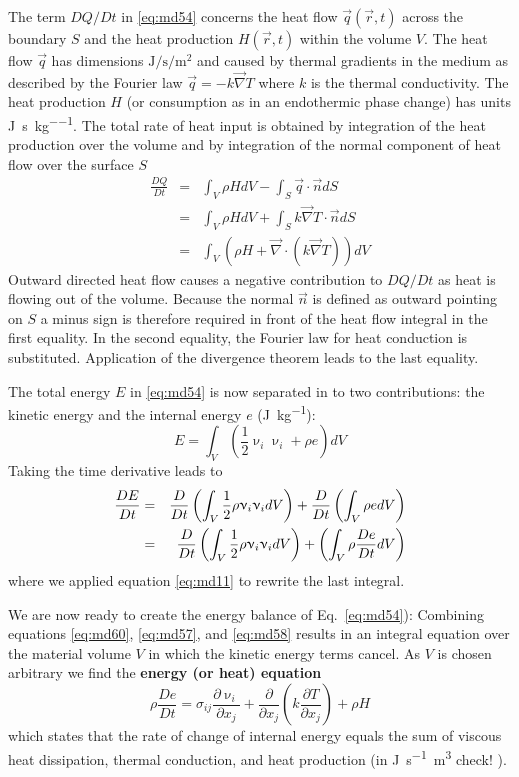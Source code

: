 The term $DQ/Dt$ in \eqref{eq:md54} concerns the heat flow $\vec{q}(\vec{r},t)$
across the boundary $S$ and the heat production $H(\vec{r},t)$
within the volume $V$. The heat flow $\vec{q}$ has dimensions 
$\si{\joule\per\second\per\square\meter}$
and caused by thermal gradients in the medium as described by the Fourier law
$\vec{q}=-k \vec\nabla T$ where $k$ is the thermal conductivity. 
The heat production $H$ (or consumption as in an endothermic phase change) has units 
\si{\joule\per\second\per\kg}.
The total rate of heat input is
obtained by integration of the heat production over the volume and by integration of the
normal component of heat flow over the surface $S$
\begin{eqnarray}
\frac{DQ}{Dt} 
&=& \int_V \rho H dV - \int_S \vec{q} \cdot \vec{n} dS \\
&=& \int_V \rho H dV + \int_S k \vec\nabla T  \cdot \vec{n} dS \\
&=& \int_V \left(  \rho H + \vec\nabla \cdot (  k \vec\nabla T )  \right) dV 
\label{eq:md58}
\end{eqnarray}
Outward directed heat flow causes a negative contribution to $DQ/Dt$ 
as heat is flowing out of
the volume. Because the normal $\vec{n}$ is defined as outward pointing on $S$ a minus sign is
therefore required in front of the heat flow integral in the first equality. In the second
equality, the Fourier law for heat conduction is substituted. Application of the divergence
theorem leads to the last equality.

The total energy $E$ in \eqref{eq:md54} is now separated in to two contributions: the kinetic energy and
the internal energy $e$ (\si{\joule\per\kg}):
\begin{equation}
E = \int_V (\frac{1}{2} \upnu_i \upnu_i + \rho e)dV
\label{eq:md59}
\end{equation}
Taking the time derivative leads to
\begin{eqnarray}
\frac{DE}{Dt} &=& \frac{D}{Dt} \left( \int_V \frac12 \rho \upnu_i \upnu_i dV   \right)
+ \frac{D}{Dt} \left( \int_V \rho e dV  \right) \nonumber\\
&=& \frac{D}{Dt} \left( \int_V \frac12 \rho \upnu_i \upnu_i dV   \right)
+ \left( \int_V \rho \frac{De}{Dt} dV  \right) 
\label{eq:md60}
\end{eqnarray}
where we applied equation \eqref{eq:md11} to rewrite the last integral.

We are now ready to create the energy balance of Eq.~\eqref{eq:md54}):
Combining equations \eqref{eq:md60}, \eqref{eq:md57}, and
\eqref{eq:md58} results in an integral equation over the material volume $V$ in which the kinetic
energy terms cancel. As $V$ is chosen arbitrary we find the {\bf energy (or heat) equation}
\begin{equation}
\rho \frac{De}{Dt} = \sigma_{ij} \frac{\partial \upnu_i}{\partial x_j} + 
\frac{\partial }{\partial x_j} (k \frac{\partial T}{\partial x_j}) + \rho H
\label{eq:md61}
\end{equation}
which states that the rate of change of internal energy equals the sum of viscous heat
dissipation, thermal conduction, and heat production 
(in \si{\joule\per\second\cubic\meter} {\color{red}check!} ).

